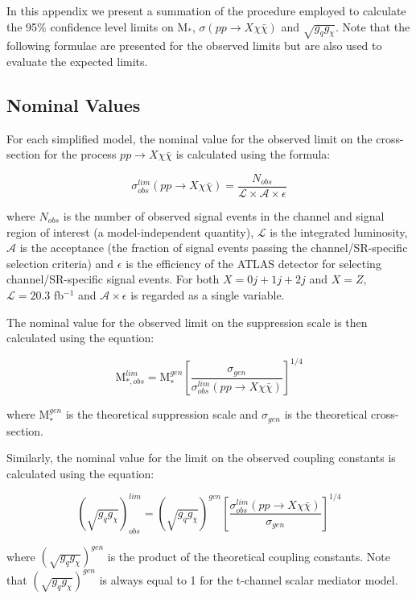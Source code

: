 \begin{flushleft}
In this appendix we present a summation of the procedure employed to calculate the 95\% confidence level limits on M$_{*}$, $\sigma(pp \rightarrow X\chi\bar{\chi})$ and $\sqrt{g_{q}g_{\chi}}$. Note that the following formulae are presented for the observed limits but are also used to evaluate the expected limits.
\end{flushleft}

\subsection{Nominal Values}
\begin{flushleft}
For each simplified model, the nominal value for the observed limit on the cross-section for the process $pp \rightarrow X\chi\bar{\chi}$ is calculated using the formula:

\begin{equation}
\label{sigma_nom}
\sigma_{obs}^{lim}(pp \rightarrow X\chi\bar{\chi}) = \frac{N_{obs}}{\mathcal{L}\times\mathcal{A}\times\epsilon}
\end{equation}

where $N_{obs}$ is the number of observed signal events in the channel and signal region of interest (a model-independent quantity), $\mathcal{L}$ is the integrated luminosity, $\mathcal{A}$ is the acceptance (the fraction of signal events passing the channel/SR-specific selection criteria) and $\epsilon$ is the efficiency of the ATLAS detector for selecting channel/SR-specific signal events. For both $X=0j +1j + 2j$ and $X=Z$, $\mathcal{L}=20.3$ fb$^{-1}$ and $\mathcal{A}\times\epsilon$ is regarded as a single variable.
\bigskip

The nominal value for the observed limit on the suppression scale is then calculated using the equation:

\begin{equation}
\label{M_*_nom}
\mbox{M}_{*, obs}^{lim} = \mbox{M}_{*}^{gen}\left[\frac{\sigma_{gen}}{\sigma_{obs}^{lim}(pp \rightarrow X\chi\bar{\chi})}\right]^{1/4}
\end{equation}

where M$_{*}^{gen}$ is the theoretical suppression scale and $\sigma_{gen}$ is the theoretical cross-section.
\bigskip

Similarly, the nominal value for the limit on the observed coupling constants is calculated using the equation:

\begin{equation}
\label{coupling_nom}
(\sqrt{g_{q}g_{\chi}})_{obs}^{lim} = (\sqrt{g_{q}g_{\chi}})^{gen}\left[\frac{\sigma_{obs}^{lim}(pp \rightarrow X\chi\bar{\chi})}{\sigma_{gen}}\right]^{1/4}
\end{equation}

where $(\sqrt{g_{q}g_{\chi}})^{gen}$ is the product of the theoretical coupling constants. Note that $(\sqrt{g_{q}g_{\chi}})^{gen}$ is always equal to 1 for the t-channel scalar mediator model. 
\end{flushleft}

